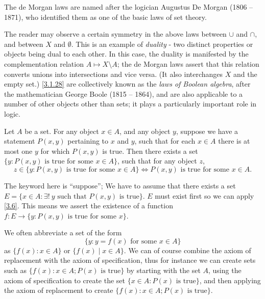 \begin{rmk}\label{3.1.29}
  The de Morgan laws are named after the logician Augustus De Morgan (1806 -- 1871), who identified them as one of the basic laws of set theory.
\end{rmk}

\begin{rmk}\label{3.1.30}
  The reader may observe a certain symmetry in the above laws between \(\cup\) and \(\cap\), and between \(X\) and \(\emptyset\).
  This is an example of \emph{duality} - two distinct properties or objects being dual to each other.
  In this case, the duality is manifested by the complementation relation \(A \mapsto X \setminus A\);
  the de Morgan laws assert that this relation converts unions into intersections and vice versa.
  (It also interchanges \(X\) and the empty set.)
  \cref{3.1.28} are collectively known as the \emph{laws of Boolean algebra}, after the mathematician George Boole (1815 -- 1864), and are also applicable to a number of other objects other than sets;
  it plays a particularly important role in logic.
\end{rmk}

\begin{ax}[Replacement]\label{3.6}
  Let \(A\) be a set.
  For any object \(x \in A\), and any object \(y\), suppose we have a statement \(P(x, y)\) pertaining to \(x\) and \(y\), such that for each \(x \in A\) there is at most one \(y\) for which \(P(x, y)\) is true.
  Then there exists a set \(\{y : P(x, y) \text{ is true for some } x \in A\}\), such that for any object \(z\),
  \[
    z \in \{y: P(x, y) \text{ is true for some } x \in A\} \iff P(x, y) \text{ is true for some } x \in A.
  \]
\end{ax}

\begin{note}
  The keyword here is ``suppose'';
  We have to assume that there exists a set \(E = \{x \in A : \exists!\ y \text{ such that } P(x, y) \text{ is true}\}\).
  \(E\) must exist first so we can apply \cref{3.6}.
  This means we assert the existence of a function \(f : E \to \{y : P(x, y) \text{ is true for some } x\}\).
\end{note}

\begin{note}
  We often abbreviate a set of the form
  \[
    \{y : y = f(x) \text{ for some } x \in A\}
  \]
  as \(\{f(x) : x \in A\}\) or \(\{f(x) \mid x \in A\}\).
  We can of course combine the axiom of replacement with the axiom of specification, thus for instance we can create sets such as \(\{f(x) : x \in A; P(x) \text{ is true}\}\) by starting with the set \(A\), using the axiom of specification to create the set \(\{x \in A : P(x) \text{ is true}\}\), and then applying the axiom of replacement to create \(\{f(x) : x \in A; P(x) \text{ is true}\}\).
\end{note}

